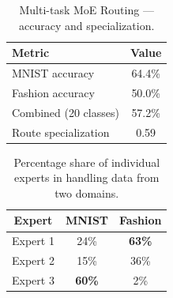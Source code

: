 \begin{table}[h!]
\centering
\caption{Multi-task MoE Routing --- accuracy and specialization.}
\begin{tabular}{l c}
\hline
\textbf{Metric} & \textbf{Value} \\
\hline
MNIST accuracy & 64.4\% \\
Fashion accuracy & 50.0\% \\
Combined (20 classes) & 57.2\% \\
Route specialization & 0.59 \\
\hline
\end{tabular}
\label{tab:moe_routing_results}
\end{table}

\begin{table}[h!]
\centering
\caption{Percentage share of individual experts in handling data from two domains.}
\begin{tabular}{c c c}
\hline
\textbf{Expert} & \textbf{MNIST} & \textbf{Fashion} \\
\hline
Expert 1 & 24\% & \textbf{63\%} \\
Expert 2 & 15\% & 36\% \\
Expert 3 & \textbf{60\%} & 2\% \\
\hline
\end{tabular}
\label{tab:moe_routing_distribution}
\end{table}
